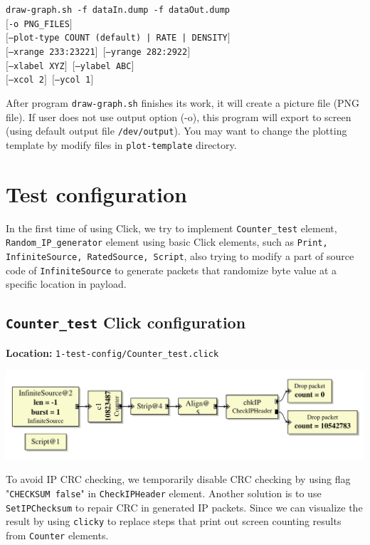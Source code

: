 \documentclass[a4paper]{article}
\begin{document}
\begin{enumerate}
\texttt{draw-graph.sh -f dataIn.dump -f dataOut.dump \\
      $[$-o PNG\_FILES$]$\\
      $[$--plot-type COUNT (default) | RATE | DENSITY$]$\\
      $[$--xrange 233:23221$]$  $[$--yrange 282:2922$]$\\
      $[$--xlabel XYZ$]$  $[$--ylabel ABC$]$\\
      $[$--xcol 2$]$  $[$--ycol 1$]$}
      
  After program \texttt{draw-graph.sh} finishes its work, it will create a picture file (PNG file). If user does not use output option (-o), this program will export to screen (using default output file \texttt{/dev/output}). You may want to change the plotting template by modify files in \texttt{plot-template} directory.
      \end{enumerate}
  \section{Test configuration}
  In the first time of using Click, we try to implement \texttt{Counter\_test} element, \texttt{Random\_IP\_generator} element using basic Click elements, such as \texttt{Print, InfiniteSource, RatedSource, Script}, also trying to modify a part of source code of \texttt{InfiniteSource} to generate packets that randomize byte value at a specific location in payload.
  \subsection{\texttt{Counter\_test} Click configuration}
  \textbf{Location:} \texttt{1-test-config/Counter\_test.click} \\
  \begin{center}
	  \includegraphics[scale=0.6]{counter_test.pdf}
	  \label{fig:countertest}
  \end{center}
  To avoid IP CRC checking, we temporarily disable CRC checking by using flag "\texttt{CHECKSUM false}" in \texttt{CheckIPHeader} element. Another solution is to use \texttt{SetIPChecksum} to repair CRC in generated IP packets. Since we can visualize the result by using \texttt{clicky} to replace steps that print out screen counting results from \texttt{Counter} elements. 
\end{document}
